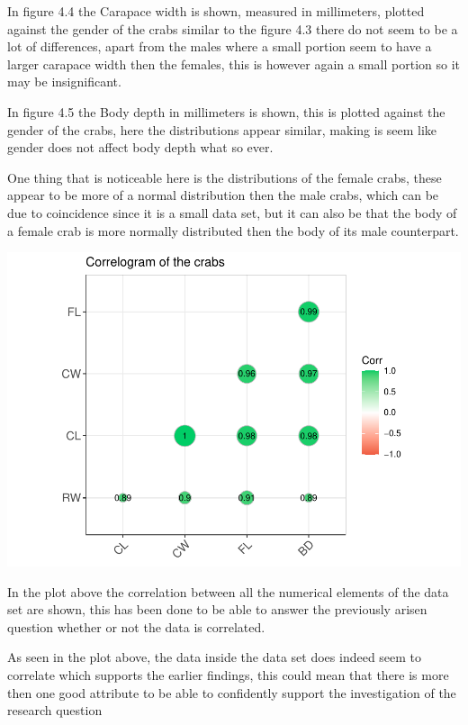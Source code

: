 \documentclass[
]{article}
\begin{document}
In figure 4.4 the Carapace width is shown, measured in millimeters,
plotted against the gender of the crabs similar to the figure 4.3 there
do not seem to be a lot of differences, apart from the males where a
small portion seem to have a larger carapace width then the females,
this is however again a small portion so it may be insignificant.

In figure 4.5 the Body depth in millimeters is shown, this is plotted
against the gender of the crabs, here the distributions appear similar,
making is seem like gender does not affect body depth what so ever.

One thing that is noticeable here is the distributions of the female
crabs, these appear to be more of a normal distribution then the male
crabs, which can be due to coincidence since it is a small data set, but
it can also be that the body of a female crab is more normally
distributed then the body of its male counterpart.

\begin{center}\includegraphics{CrabProject_files/figure-latex/unnamed-chunk-1-1} \end{center}

In the plot above the correlation between all the numerical elements of
the data set are shown, this has been done to be able to answer the
previously arisen question whether or not the data is correlated.

As seen in the plot above, the data inside the data set does indeed seem
to correlate which supports the earlier findings, this could mean that
there is more then one good attribute to be able to confidently support
the investigation of the research question
\end{document}
